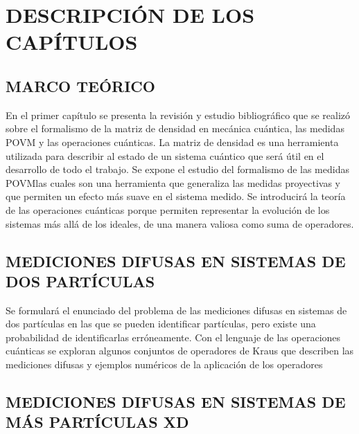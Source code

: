 \chapter{DESCRIPCIÓN DE LOS CAPÍTULOS} 
\section{MARCO TEÓRICO}
En el primer capítulo  se presenta la revisión y estudio bibliográfico que se realizó sobre el formalismo de la matriz de densidad en mecánica cuántica, las medidas POVM y las operaciones cuánticas. La matriz de densidad es una herramienta utilizada para describir al estado de un sistema cuántico que será útil en el desarrollo de todo el trabajo.  Se expone el estudio del formalismo de las medidas POVM\@ las cuales son una herramienta que generaliza las medidas proyectivas y que permiten un efecto más suave en el sistema medido.  Se introducirá la teoría de las operaciones cuánticas  porque permiten representar la evolución de los sistemas más allá de los ideales, de una manera valiosa como suma de operadores.

\section{MEDICIONES DIFUSAS EN SISTEMAS DE DOS PARTÍCULAS}
Se formulará el enunciado del problema de las mediciones difusas en sistemas de dos partículas en las que se pueden identificar partículas, pero existe una probabilidad de identificarlas erróneamente. Con el lenguaje de las operaciones cuánticas se exploran algunos conjuntos de operadores de Kraus que describen las mediciones difusas y ejemplos numéricos de la aplicación de los operadores



\section{MEDICIONES DIFUSAS EN SISTEMAS DE MÁS PARTÍCULAS XD}

 \lipsum{}